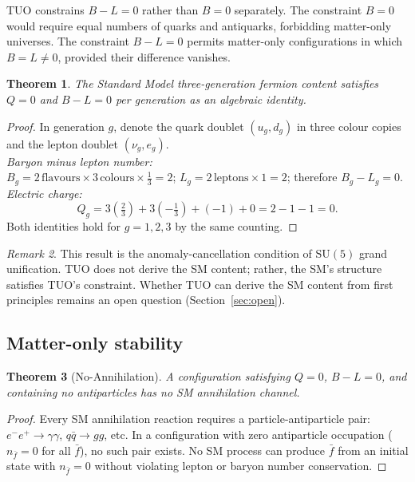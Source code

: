 \documentclass[12pt,a4paper]{article}
\newtheorem{theorem}{Theorem}[section]
\theoremstyle{definition}
\theoremstyle{remark}
\newtheorem{remark}[theorem]{Remark}
\begin{document}
TUO constrains $B - L = 0$ rather than $B = 0$ separately.
The constraint $B = 0$ would require equal numbers of quarks and antiquarks,
forbidding matter-only universes.
The constraint $B - L = 0$ permits matter-only configurations in which
$B = L \neq 0$, provided their difference vanishes.

\begin{theorem}\label{thm:bmL}
The Standard Model three-generation fermion content satisfies
$Q = 0$ and $B - L = 0$ per generation as an algebraic identity.
\end{theorem}
\begin{proof}
In generation $g$, denote the quark doublet $(u_g, d_g)$ in three colour
copies and the lepton doublet $(\nu_g, e_g)$.
\medskip\\
\textit{Baryon minus lepton number:}\\
$B_g = 2\,\text{flavours} \times 3\,\text{colours} \times \tfrac{1}{3} = 2$;
$L_g = 2\,\text{leptons} \times 1 = 2$;
therefore $B_g - L_g = 0$.
\medskip\\
\textit{Electric charge:}
\[
  Q_g
  = 3\!\left(\tfrac{2}{3}\right) + 3\!\left(-\tfrac{1}{3}\right) + (-1) + 0
  = 2 - 1 - 1 = 0.
\]
Both identities hold for $g = 1, 2, 3$ by the same counting.
\end{proof}

\begin{remark}
This result is the anomaly-cancellation condition of $\mathrm{SU}(5)$
grand unification.
TUO does not derive the SM content; rather, the SM's structure satisfies
TUO's constraint.
Whether TUO can derive the SM content from first principles remains an
open question (Section~\ref{sec:open}).
\end{remark}

\subsection{Matter-only stability}

\begin{theorem}[No-Annihilation]\label{thm:stability}
A configuration satisfying $Q = 0$, $B-L = 0$, and containing no
antiparticles has no SM annihilation channel.
\end{theorem}
\begin{proof}
Every SM annihilation reaction requires a particle-antiparticle pair:
$e^- e^+ \to \gamma\gamma$, $q\bar{q} \to gg$, etc.
In a configuration with zero antiparticle occupation ($n_{\bar{f}} = 0$ for
all $\bar{f}$), no such pair exists.
No SM process can produce $\bar{f}$ from an initial state with $n_{\bar{f}}=0$
without violating lepton or baryon number conservation.
\end{proof}
\end{document}
